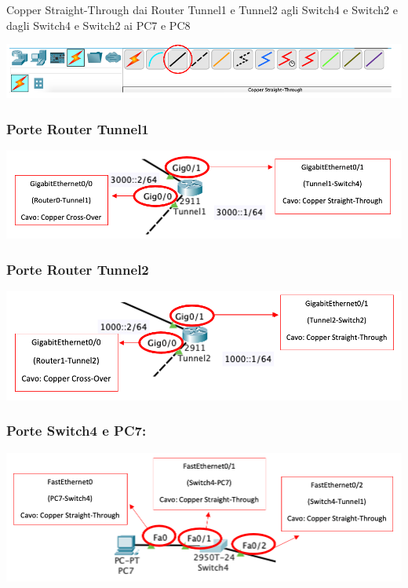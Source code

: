\noindent Copper Straight-Through dai Router Tunnel1 e Tunnel2 agli Switch4 e Switch2 e dagli Switch4 e Switch2 ai PC7 e PC8

\begin{center}
    \includegraphics[width=\linewidth]{images/07.routing-sicurezza/tunneling/05.png}
\end{center}

\subsubsection*{Porte Router Tunnel1}

\begin{center}
    \includegraphics[width=\linewidth]{images/07.routing-sicurezza/tunneling/06.png}
\end{center}

\subsubsection*{Porte Router Tunnel2}

\begin{center}
    \includegraphics[width=\linewidth]{images/07.routing-sicurezza/tunneling/07.png}
\end{center}

\subsubsection*{Porte Switch4 e PC7:}

\begin{center}
    \includegraphics[width=\linewidth]{images/07.routing-sicurezza/tunneling/08.png}
\end{center}

